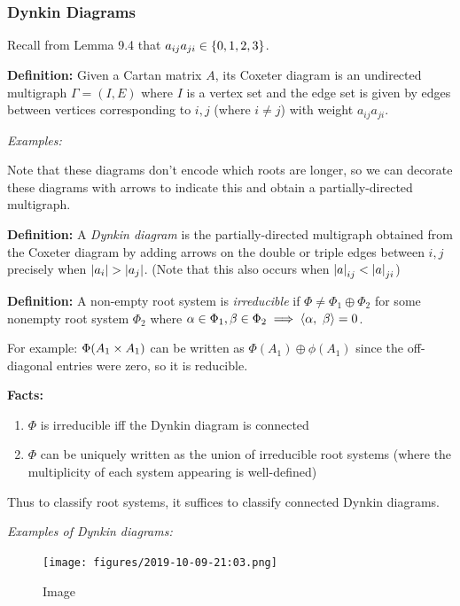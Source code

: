 \hypertarget{dynkin-diagrams}{%
\subsubsection{Dynkin Diagrams}\label{dynkin-diagrams}}

Recall from Lemma 9.4 that \(a_{ij} a_{ji} \in \left\{{0,1,2,3}\right\}\).

\textbf{Definition:} Given a Cartan matrix \(A\), its Coxeter diagram is
an undirected multigraph \(\Gamma = (I, E)\) where \(I\) is a vertex set
and the edge set is given by edges between vertices corresponding to
\(i, j\) (where \(i\neq j\)) with weight \(a_{ij} a_{ji}\).

\emph{Examples:}

Note that these diagrams don't encode which roots are longer, so we can
decorate these diagrams with arrows to indicate this and obtain a
partially-directed multigraph.

\textbf{Definition:} A \emph{Dynkin diagram} is the partially-directed
multigraph obtained from the Coxeter diagram by adding arrows on the
double or triple edges between \(i, j\) precisely when
\({\left\lvert {a_i} \right\rvert} > {\left\lvert {a_j} \right\rvert}\). (Note that this also occurs when
\({\left\lvert {a} \right\rvert}_{ij} < {\left\lvert {a} \right\rvert}_{ji}\))

\textbf{Definition:} A non-empty root system is \emph{irreducible} if
\(\Phi \neq \Phi_1 \oplus \Phi_2\) for some nonempty root system
\(\Phi_2\) where
\(\alpha\in \Phi_1, \beta\in \Phi_2 \implies {\left\langle {\alpha},~{\beta} \right\rangle} = 0\).

For example: \(\Phi(A_1 \times A_1)\) can be written as
\(\Phi(A_1) \oplus \phi(A_1)\) since the off-diagonal entries were zero,
so it is reducible.

\textbf{Facts:}

\begin{enumerate}
\def\labelenumi{\alph{enumi}.}
\tightlist
\item
  \(\Phi\) is irreducible iff the Dynkin diagram is connected
\item
  \(\Phi\) can be uniquely written as the union of irreducible root
  systems (where the multiplicity of each system appearing is
  well-defined)
\end{enumerate}

Thus to classify root systems, it suffices to classify connected Dynkin
diagrams.

\emph{Examples of Dynkin diagrams:}

\begin{figure}
\centering
\texttt{[image: figures/2019-10-09-21:03.png]}
\caption{Image}
\end{figure}

